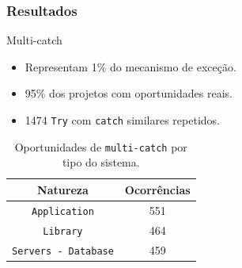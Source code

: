 \documentclass[]{beamer}
\begin{document}
	\begin{frame}[fragile, label=re]\frametitle{Resultados}
		\begin{block}{Multi-catch}
			\begin{itemize}
				\item Representam 1\% do mecanismo de exceção.
				
				\item 95\% dos projetos com oportunidades reais.
				
				\item 1474 \texttt{Try} com \texttt{catch} similares repetidos.
				
			\end{itemize}
			
		\end{block}
		
		\begin{table}[h]
			\centering
			\caption{Oportunidades de \texttt{multi-catch} por tipo do sistema.}
			\begin{tabular}{cc}
				\hline
				Natureza & Ocorrências \\ 
				\hline \hline
				\texttt{Application} & 551 \\ 
				\texttt{Library} &  464 \\ 
				\texttt{Servers - Database} &  459 \\ \hline
			\end{tabular}
			\label{tab:oportunidadesMulticatch} %
		\end{table}
		
	\end{frame}	
	
\end{document}
